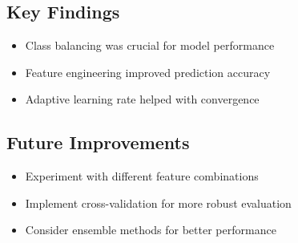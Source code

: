 \documentclass[10pt,conference,compsocconf]{IEEEtran}
\begin{document}
\subsection{Key Findings}
\begin{itemize}
    \item Class balancing was crucial for model performance
    \item Feature engineering improved prediction accuracy
    \item Adaptive learning rate helped with convergence
\end{itemize}

\subsection{Future Improvements}
\begin{itemize}
    \item Experiment with different feature combinations
    \item Implement cross-validation for more robust evaluation
    \item Consider ensemble methods for better performance
\end{itemize}
\end{document}
